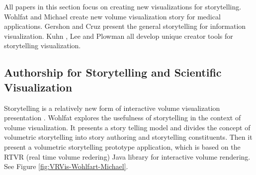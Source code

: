 \documentclass{egpubl}
\begin{document}
All papers in this section focus on creating new visualizations for storytelling. Wohlfat and Michael \cite{wohlfat} create new volume visualization story for medical applications. Gershon \cite{Gershon2} and Cruz \cite{cruz2011} present the general storytelling for information visualization. Kuhn \cite{kuhn2012}, Lee \cite{lee2013} and Plowman \cite{plowman1999} all develop unique creator tools for storytelling visualization. 


\subsection{Authorship for  Storytelling and Scientific Visualization}
Storytelling is a relatively new form of interactive volume visualization presentation \cite{wohlfat}.
Wohlfat  explores the usefulness of storytelling in the context of volume visualization. It presents a story telling model and divides the concept of volumetric storytelling into story authoring and storytelling constituents. Then it present a volumetric storytelling prototype application, which is based on the RTVR (real time volume redering) Java library \cite{mroz2001rtvr} for interactive volume rendering. See Figure \ref{fig:VRVis-Wohlfart-Michael}\cite{wohlfat}.
\end{document}
